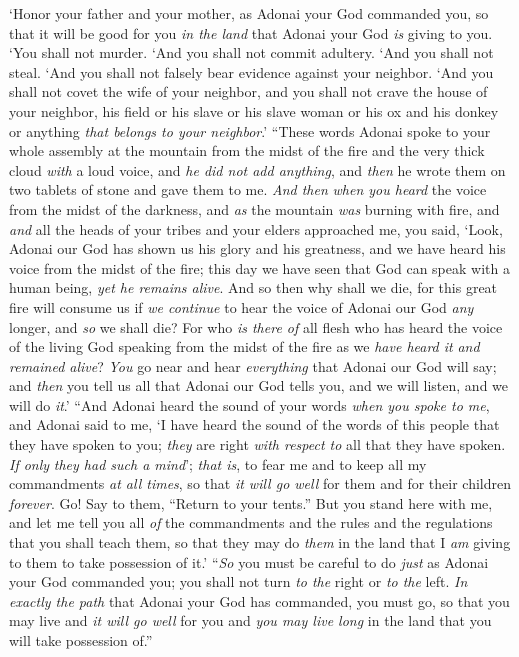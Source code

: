 \begin{biblechapter}
\verse ‘Honor your father and your mother, as Adonai your God commanded you, so that it will be good for you \textit{in the land} that Adonai your God \textit{is} giving to you.
\verse ‘You shall not murder.
\verse ‘And you shall not commit adultery.
\verse ‘And you shall not steal.
\verse ‘And you shall not falsely bear evidence against your neighbor.
\verse ‘And you shall not covet the wife of your neighbor, and you shall not crave the house of your neighbor, his field or his slave or his slave woman or his ox and his donkey or anything \textit{that belongs to your neighbor}.’
\verse “These words Adonai spoke to your whole assembly at the mountain from the midst of the fire and the very thick cloud \textit{with} a loud voice, and \textit{he did not add anything}, and \textit{then} he wrote them on two tablets of stone and gave them to me.
\verse \textit{And then} \textit{when you heard} the voice from the midst of the darkness, and \textit{as} the mountain \textit{was} burning with fire, and \textit{and} all the heads of your tribes and your elders approached me,
\verse you said, ‘Look, Adonai our God has shown us his glory and his greatness, and we have heard his voice from the midst of the fire; this day we have seen that God can speak with a human being, \textit{yet he remains alive}.
\verse And so then why shall we die, for this great fire will consume us if \textit{we continue} to hear the voice of Adonai our God \textit{any} longer, and \textit{so} we shall die?
\verse For who \textit{is there of} all flesh who has heard the voice of the living God speaking from the midst of the fire as we \textit{have heard it} \textit{and remained alive}?
\verse \textit{You} go near and hear \textit{everything} that Adonai our God will say; and \textit{then} you tell us all that Adonai our God tells you, and we will listen, and we will do \textit{it}.’
\verse “And Adonai heard the sound of your words \textit{when you spoke to me}, and Adonai said to me, ‘I have heard the sound of the words of this people that they have spoken to you; \textit{they} are right \textit{with respect to} all that they have spoken.
\verse \textit{If only} \textit{they had such a mind}’; \textit{that is}, to fear me and to keep all my commandments \textit{at all times}, so that \textit{it will go well} for them and for their children \textit{forever}.
\verse Go! Say to them, “Return to your tents.”
\verse But you stand here with me, and let me tell you all \textit{of} the commandments and the rules and the regulations that you shall teach them, so that they may do \textit{them} in the land that I \textit{am} giving to them to take possession of it.’
\verse “\textit{So} you must be careful to do \textit{just} as Adonai your God commanded you; you shall not turn \textit{to the} right or \textit{to the} left.
\verse \textit{In exactly the path} that Adonai your God has commanded, you must go, so that you may live and \textit{it will go well} for you and \textit{you may live long} in the land that you will take possession of.”
\end{biblechapter}

